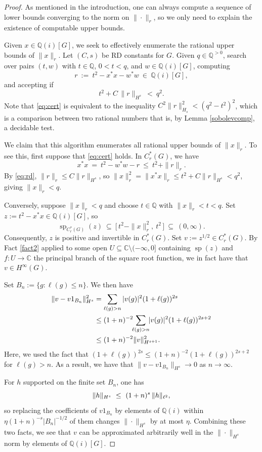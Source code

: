 \documentclass[10pt,a4paper]{amsart}
\newcommand{\Q}{\mathbb{Q}}
\DeclareMathOperator{\spec}{sp}
\newcommand{\Cr}{C^*_r(G)}
\newcommand{\Qi}{\Q(i)}
\theoremstyle{plain}
\theoremstyle{definition}
\numberwithin{equation}{section}
\begin{document}
\begin{proof}
As mentioned in the introduction, one can always compute a sequence of lower bounds converging to the norm on $\|\cdot\|_r$, so we only need to explain the existence of computable upper bounds.

Given $x\in \mathbb{Q}(i)[G]$, we seek to effectively enumerate the rational upper bounds of $\|x\|_r$.  Let $(C,s)$ be RD constants for $G$.  Given $q\in\Q^{>0}$, search over pairs $(t,w)$ with $t\in\Q$, $0<t<q$, and $w\in\Qi[G]$, computing
\[
r\ :=\ t^2-x^*x-w^*w\ \in\ \Qi[G],
\]
and accepting if
\begin{equation}\label{eq:cert}
t^2+C\,\|r\|_{H^s}\ <\ q^2 .
\end{equation}
Note that \eqref{eq:cert} is equivalent to the inequality $C^2\|r\|_{H_s}^2<(q^2-t^2)^2$, which is a comparison between two rational numbers that is, by Lemma \ref{sobolevcomp}, a decidable test.  

We claim that this algorithm enumerates all rational upper bounds of $\|x\|_r$.  To see this, first suppose that \eqref{eq:cert} holds. In $\Cr$, we have
\[
x^*x\ =\ t^2-w^*w-r\ \le\ t^2+\|r\|_r.
\]
By \eqref{eq:rd}, $\|r\|_r\le C\|r\|_{H^s}$, so $\|x\|_r^2=\|x^*x\|_r\le t^2+C\|r\|_{H^s}<q^2$, giving $\|x\|_r<q$.

Conversely, suppose $\|x\|_r<q$ and choose $t\in\Q$ with $\|x\|_r<t<q$. Set $z:=t^2-x^*x\in\Qi[G]$, so
\[
\spec_{\Cr}(z)\ \subseteq\ \big[\,t^2-\|x\|_r^2,\ t^2\,\big]\ \subseteq\ (0,\infty).
\]
Consequently, $z$ is positive and invertible in $\Cr$.  Set $v:=z^{1/2}\in \Cr$.  By Fact \ref{fact2} applied to some open $U\subseteq \mathbb{C}\setminus (-\infty,0]$ containing $\spec(z)$ and$f:U\to \mathbb{C}$ the principal branch of the square root function, we in fact have that $v\in H^\infty(G)$. 

 
Set $B_n:=\{g:\ell(g)\le n\}$.  
We then have
\begin{alignat}{2}
\|v-v1_{B_n}\|_{H^{s}}^2&=\sum_{\ell(g)>n}|v(g)|^2(1+\ell(g))^{2s}\notag \\ \notag
    &\le(1+n)^{-2}\!\!\sum_{\ell(g)>n}\!\!|v(g)|^2(1+\ell(g))^{2s+2}\\ \notag
    &\le(1+n)^{-2}\|v\|_{H^{s+1}}^2.\notag
\end{alignat}
Here, we used the fact that $(1+\ell(g))^{2s}\le(1+n)^{-2}(1+\ell(g))^{2s+2}$ for $\ell(g)>n$.  As a result, we have that $\|v-v1_{B_n}\|_{H^{s}}\to 0$ as $n\to \infty$.

For $h$ supported on the finite set $B_n$, one has
\begin{equation}
\|h\|_{H^{s}}\ \le\ (1+n)^{s}\,\|h\|_{\ell^2},\notag
\end{equation}
so replacing the coefficients of $v1_{B_n}$ by elements of $\Qi$ within $\eta(1+n)^{-s}|B_n|^{-1/2}$ of them changes $\|\cdot\|_{H^{s}}$ by at most $\eta$.  Combining these two facts, we see that $v$ can be approximated arbitrarily well in the $\|\cdot\|_{H^{s}}$ norm by elements of $\Qi[G]$.


\end{proof}
\end{document}

